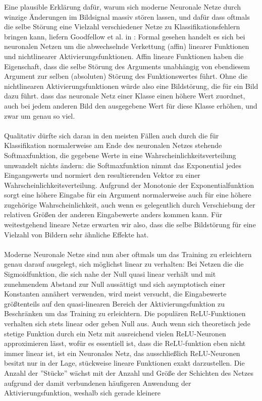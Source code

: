 \documentclass[11pt]{article} %
\begin{document}
\setcounter{tocdepth}{4}
\newtheorem{lem}{Lemma}[subsection]
\newtheorem{defi}[lem]{Definition}
\newtheorem{satz}[lem]{Satz}
\newtheorem{cor}[lem]{Korollar}
\newtheorem{theo}[lem]{Theorem}
\newtheorem{prop}[lem]{Proposition}
\newtheorem{conv}[lem]{Konvention}
\newtheorem{bsp}[lem]{Beispiel}
\newtheorem{boxh}{boxh}


Eine plausible Erklärung dafür, warum sich moderne Neuronale Netze durch winzige Änderungen im Bildsignal massiv stören lassen, und dafür dass oftmals die selbe Störung eine Vielzahl verschiedener Netze zu Klassifikationsfehlern bringen kann, liefern Goodfellow et al. in \cite{Goodfellow}: 
 Formal gesehen handelt es sich bei neuronalen Netzen um die abwechselnde Verkettung (affin) linearer Funktionen und nichtlinearer Aktivierungsfunktionen. 
Affin lineare Funktionen haben die Eigenschaft, dass die selbe Störung des Arguments unabhängig von ebendiesem Argument zur selben (absoluten) Störung des Funktionswertes führt. Ohne die nichtlinearen Aktivierungsfunktionen würde also eine Bildstörung, die für ein Bild dazu führt. dass das neuronale Netz einer Klasse einen höhere Wert zuordnet, auch bei jedem anderen Bild den ausgegebene Wert für diese Klasse erhöhen, und zwar um genau so viel. \\  \\ Qualitativ dürfte sich daran in den meisten Fällen auch durch die für Klassifikation normalerweise am Ende des neuronalen Netzes stehende Softmaxfunktion, die gegebene Werte in eine Wahrscheinlichkeitsverteilung umwandelt nichts ändern: die Softmaxfunktion nimmt das Exponential jedes Eingangswerts und normiert den resultierenden Vektor zu einer Wahrscheinlichkeitsverteilung. Aufgrund der Monotonie der Exponentialfunktion sorgt eine höhere Eingabe für ein Argument normalerweise auch für eine höhere zugehörige Wahrscheinlichkeit, auch wenn es gelegentlich durch Verschiebung der relativen Größen der anderen Eingabewerte anders kommen kann. Für weitestgehend lineare Netze erwarten wir also, dass die selbe Bildstörung für eine Vielzahl von Bildern sehr ähnliche Effekte hat. \\ \\  Moderne Neuronale Netze sind nun aber oftmals um das Training zu erleichtern genau darauf ausgelegt, sich möglichst linear zu verhalten: Bei Netzen die die Sigmoidfunktion, die sich nahe der Null quasi linear verhält und mit zunehmendem Abstand zur Null aussättigt und sich asymptotisch einer Konstanten annähert verwenden, wird meist versucht, die Eingabewerte größtenteils auf den quasi-linearen Bereich der Aktivierungsfunktion zu Beschränken um das Training zu erleichtern. Die populären ReLU-Funktionen verhalten sich stets linear oder geben Null aus. Auch wenn sich theoretisch jede stetige Funktion durch ein Netz mit ausreichend vielen ReLU-Neuronen approximieren lässt, wofür es essentiell ist, dass die ReLU-funktion eben nicht immer linear ist, ist ein Neuronales Netz, das ausschließlich ReLU-Neuronen besitzt nur in der Lage, stückweise lineare Funktionen exakt darzustellen. Die Anzahl der ''Stücke'' wächst mit der Anzahl und Größe der Schichten des Netzes aufgrund der damit verbundenen häufigeren Anwendung der Aktivierungsfunktion, weshalb sich gerade kleinere 
\end{document}
